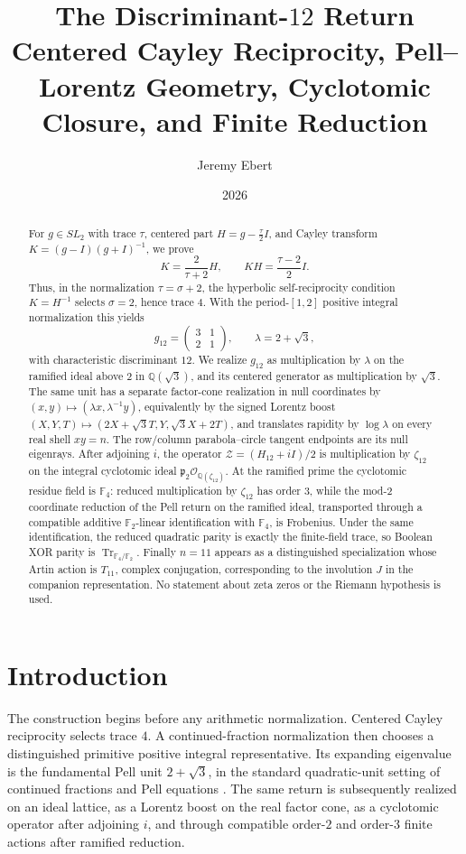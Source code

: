 \documentclass[11pt]{article}
\title{\textbf{The Discriminant-$12$ Return}\\
\large Centered Cayley Reciprocity, Pell--Lorentz Geometry, Cyclotomic Closure, and Finite Reduction}
\author{Jeremy Ebert}
\date{2026}
\theoremstyle{remark}
\newcommand{\Q}{\mathbb Q}
\newcommand{\F}{\mathbb F}
\newcommand{\OO}{\mathcal O}
\newcommand{\Tr}{\operatorname{Tr}}
\begin{document}
\maketitle

\begin{abstract}
For $g\in SL_2$ with trace $\tau$, centered part
$H=g-\tfrac{\tau}{2}I$, and Cayley transform
$K=(g-I)(g+I)^{-1}$, we prove
\[
K=\frac{2}{\tau+2}H,
\qquad
KH=\frac{\tau-2}{2}I.
\]
Thus, in the normalization $\tau=\sigma+2$, the hyperbolic self-reciprocity
condition $K=H^{-1}$ selects $\sigma=2$, hence trace $4$.  With the
period-$[1,2]$ positive integral normalization this yields
\[
g_{12}=\begin{pmatrix}3&1\\2&1\end{pmatrix},
\qquad
\lambda=2+\sqrt3,
\]
with characteristic discriminant $12$.  We realize $g_{12}$ as multiplication
by $\lambda$ on the ramified ideal above $2$ in $\Q(\sqrt3)$, and its centered
generator as multiplication by $\sqrt3$.  The same unit has a separate
factor-cone realization in null coordinates by
$(x,y)\mapsto(\lambda x,\lambda^{-1}y)$, equivalently by the signed Lorentz
boost $(X,Y,T)\mapsto(2X+\sqrt3T,Y,\sqrt3X+2T)$, and translates rapidity by
$\log\lambda$ on every real shell $xy=n$.  The row/column parabola--circle
tangent endpoints are its null eigenrays.  After adjoining $i$, the operator
$\mathcal Z=(H_{12}+iI)/2$ is multiplication by $\zeta_{12}$ on the integral
cyclotomic ideal $\mathfrak p_2\OO_{\Q(\zeta_{12})}$.  At the ramified prime
the cyclotomic residue field is $\F_4$: reduced multiplication by
$\zeta_{12}$ has order $3$, while the mod-$2$ coordinate reduction of the Pell
return on the ramified ideal, transported through a compatible additive
$\F_2$-linear identification with $\F_4$, is Frobenius.  Under the same
identification, the reduced quadratic parity is exactly the finite-field
trace, so Boolean XOR parity is $\Tr_{\F_4/\F_2}$.  Finally $n=11$ appears as
a distinguished specialization whose Artin action is $T_{11}$, complex
conjugation, corresponding to the involution $J$ in the companion
representation.  No statement about zeta zeros or the Riemann hypothesis is
used.
\end{abstract}

\section{Introduction}

The construction begins before any arithmetic normalization.  Centered Cayley
reciprocity selects trace $4$.  A continued-fraction normalization then
chooses a distinguished primitive positive integral representative.  Its
expanding eigenvalue is the fundamental Pell unit $2+\sqrt3$, in the standard
quadratic-unit setting of continued fractions and Pell equations
\cite{HardyWright,Serre}.  The same return is subsequently realized on an
ideal lattice, as a Lorentz boost on the real factor cone, as a cyclotomic
operator after adjoining $i$, and through compatible order-$2$ and order-$3$
finite actions after ramified reduction.
\end{document}
